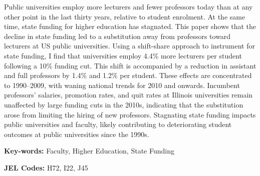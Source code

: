Public universities employ more lecturers and fewer professors today than at any other point in the last thirty years, relative to student enrolment.
At the same time, state funding for higher education has stagnated.
This paper shows that the decline in state funding led to a substitution away from professors toward lecturers at US public universities.
Using a shift-share approach to instrument for state funding, I find that universities employ 4.4\% more lecturers per student following a 10\% funding cut.
This shift is accompanied by a reduction in assistant and full professors by 1.4\% and 1.2\%  per student.
These effects are concentrated to 1990--2009, with waning national trends for 2010 and onwards.
Incumbent professors' salaries, promotion rates, and quit rates at Illinois universities remain unaffected by large funding cuts in the 2010s, indicating that the substitution arose from limiting the hiring of new professors.
Stagnating state funding impacts public universities and faculty, likely contributing to deteriorating student outcomes at public universities since the 1990s.

\vfill
\noindent
\textbf{Key-words:}
Faculty,
Higher Education,
State Funding

\vspace{0.05cm}
\noindent
\textbf{JEL Codes:} H72, I22, J45
